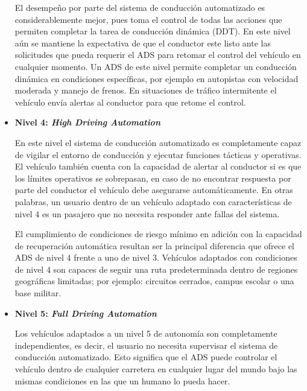 \begin{itemize}
    El desempeño por parte del sistema de conducción automatizado es considerablemente mejor, pues toma el control de todas las acciones que permiten completar la tarea de conducción dinámica (DDT). En este nivel aún se mantiene la expectativa de que el conductor este listo ante las solicitudes que pueda requerir el ADS para retomar el control del vehículo en cualquier momento. Un ADS de este nivel permite completar un conducción dinámica en condiciones específicas, por ejemplo en autopistas con velocidad moderada y manejo de frenos. En situaciones de tráfico intermitente el vehículo envía alertas al conductor para que retome el control.
    
    \item \textbf{Nivel 4: \textit{High Driving Automation}} 
    
    En este nivel el sistema de conducción automatizado es completamente capaz de vigilar el entorno de conducción y ejecutar funciones tácticas y operativas. El vehículo también cuenta con la capacidad de alertar al conductor si es que los límites operativos se sobrepasan, en caso de no encontrar respuesta por parte del conductor el vehículo debe asegurarse automáticamente. En otras palabras, un usuario dentro de un vehículo adaptado con características de nivel 4 es un pasajero que no necesita responder ante fallas del sistema.
    
    El cumplimiento de condiciones de riesgo mínimo en adición con la capacidad de recuperación automática resultan ser la principal diferencia que ofrece el ADS  de nivel 4 frente a uno de nivel 3. Vehículos adaptados con condiciones de nivel 4 son capaces de seguir una ruta predeterminada dentro de regiones geográficas limitadas; por ejemplo: circuitos cerrados, campus escolar o una base militar.
    
    
    \item \textbf{Nivel 5: \textit{Full Driving Automation}} 
    
    Los vehículos adaptados a un nivel 5 de autonomía son completamente independientes, es decir, el usuario no necesita supervisar el sistema de conducción automatizado. Esto significa que el ADS puede controlar el vehículo dentro de cualquier carretera en cualquier lugar del mundo bajo las mismas condiciones en las que un humano lo pueda hacer.
    

\end{itemize}
